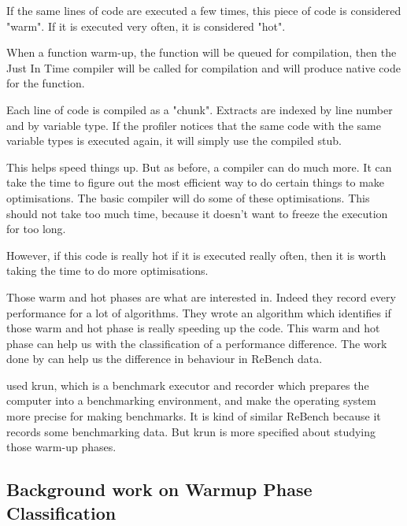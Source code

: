 \documentclass[12pt,a4paper]{article}
\begin{document}
If the same lines of code are executed a few times, this piece of code is considered "warm". If it is executed very often, it is considered "hot".

When a function warm-up, the function will be queued for compilation, then the Just In Time compiler will be called for compilation and will produce native code for the function.

Each line of code is compiled as a "chunk". Extracts are indexed by line number and by variable type. If the profiler notices that the same code with the same variable types is executed again, it will simply use the compiled stub.

This helps speed things up. But as before, a compiler can do much more. It can take the time to figure out the most efficient way to do certain things to make optimisations. The basic compiler will do some of these optimisations. This should not take too much time, because it doesn't want to freeze the execution for too long.

However, if this code is really hot if it is executed really often, then it is worth taking the time to do more optimisations.

Those warm and hot phases are what \citep{barrett2017virtual} are interested in. Indeed they record every performance for a lot of algorithms. They wrote an algorithm which identifies if those warm and hot phase is really speeding up the code. This warm and hot phase can help us with the classification of a performance difference. The work done by \citep{barrett2017virtual} can help us the difference in behaviour in ReBench data.

\citep{barrett2017virtual} used krun, which is a benchmark executor and recorder which prepares the computer into a benchmarking environment, and make the operating system more precise for making benchmarks. It is kind of similar ReBench because it records some benchmarking data. But krun is more specified about studying those warm-up phases.

\subsection{Background work on Warmup Phase Classification}
\end{document}
